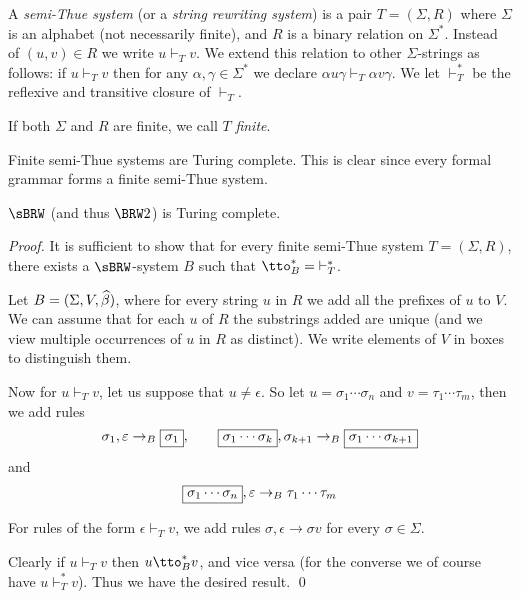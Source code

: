 \documentclass{llncs}
\begin{document}
\begin{definition}

    A \emph{semi-Thue system} (or a \emph{string rewriting system}) is a pair $T=(\Sigma,R)$ where $\Sigma$ is an alphabet
    (not necessarily finite), and $R$ is a binary relation on $\Sigma^*$.
    Instead of $(u,v)\in R$ we write $u\vdash_Tv$.
    We extend this relation to other $\Sigma$-strings as follows: if $u\vdash_Tv$ then for any $\alpha,\gamma\in\Sigma^*$ we
    declare $\alpha u\gamma\vdash_T\alpha v\gamma$.
    We let $\vdash_T^*$ be the reflexive and transitive closure of $\vdash_T$.

    If both $\Sigma$ and $R$ are finite, we call $T$ \emph{finite}.

\end{definition}

Finite semi-Thue systems are Turing complete.
This is clear since every formal grammar forms a finite semi-Thue system.

\begin{lemma}

    $\sBRW$ (and thus $\BRW2$) is Turing complete.

\end{lemma}

\begin{proof}

    It is sufficient to show that for every finite semi-Thue system $T=(\Sigma,R)$, there exists a $\sBRW$-system $B$ such that
    ${\tto_B^*}={\vdash_T^*}$.

    Let $B=(\Sigma,V,\widehat\beta)$, where for every string $u$ in $R$ we add all the prefixes of $u$ to $V$.
    We can assume that for each $u$ of $R$ the substrings added are unique (and we view multiple occurrences of $u$ in $R$ as
    distinct).
    We write elements of $V$ in boxes to distinguish them.

    Now for $u\vdash_Tv$, let us suppose that $u\neq\epsilon$.
    So let $u=\sigma_1\cdots\sigma_n$ and $v=\tau_1\cdots\tau_m$, then we add rules
    $$
    \sigma_1,\epsilon\to_B\mbox{\sigma_1},\qquad
    \mbox{\sigma_1\cdots\sigma_k},\sigma_{k+1}\to_B\mbox{\sigma_1\cdots\sigma_{k+1}}
    $$
    and
    $$
    \mbox{\sigma_1\cdots\sigma_n},\epsilon\to_B\tau_1\cdots\tau_m
    $$

    For rules of the form $\epsilon\vdash_Tv$, we add rules $\sigma,\epsilon\to\sigma v$ for every $\sigma\in\Sigma$.

    Clearly if $u\vdash_Tv$ then $u\tto_B^*v$, and vice versa (for the converse we of course have $u\vdash_T^*v$).
    Thus we have the desired result.
    \qed

\end{proof}
\end{document}

